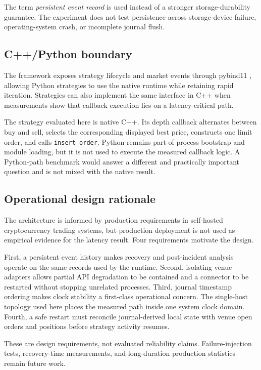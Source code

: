 \documentclass[11pt]{article}
\begin{document}
The term \emph{persistent event record} is used instead of a stronger storage-durability guarantee. The experiment does not test persistence across storage-device failure, operating-system crash, or incomplete journal flush.

\subsection{C++/Python boundary}

The framework exposes strategy lifecycle and market events through pybind11 \cite{pybind11}, allowing Python strategies to use the native runtime while retaining rapid iteration. Strategies can also implement the same interface in C++ when measurements show that callback execution lies on a latency-critical path.

The strategy evaluated here is native C++. Its depth callback alternates between buy and sell, selects the corresponding displayed best price, constructs one limit order, and calls \texttt{insert\_order}. Python remains part of process bootstrap and module loading, but it is not used to execute the measured callback logic. A Python-path benchmark would answer a different and practically important question and is not mixed with the native result.

\subsection{Operational design rationale}

The architecture is informed by production requirements in self-hosted cryptocurrency trading systems, but production deployment is not used as empirical evidence for the latency result. Four requirements motivate the design.

First, a persistent event history makes recovery and post-incident analysis operate on the same records used by the runtime. Second, isolating venue adapters allows partial API degradation to be contained and a connector to be restarted without stopping unrelated processes. Third, journal timestamp ordering makes clock stability a first-class operational concern. The single-host topology used here places the measured path inside one system clock domain. Fourth, a safe restart must reconcile journal-derived local state with venue open orders and positions before strategy activity resumes.

These are design requirements, not evaluated reliability claims. Failure-injection tests, recovery-time measurements, and long-duration production statistics remain future work.
\end{document}
